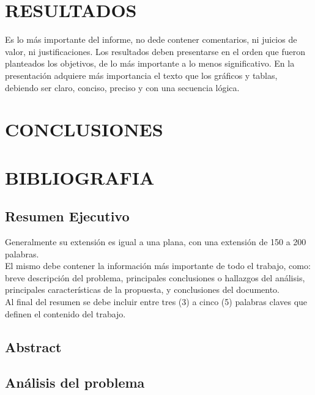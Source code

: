 \documentclass[12pt,letterpaper]{report}
\begin{document}
{\begin{multicols}{2}
	\section*{RESULTADOS}
	Es lo más importante del informe, no dede
contener comentarios, ni juicios de valor, ni
justificaciones.
Los resultados deben presentarse en el orden que fueron planteados los objetivos, de
lo más importante a lo menos significativo.
En la presentación adquiere más importancia el texto que los gráficos y tablas, debiendo ser claro, conciso, preciso y con una
secuencia lógica.
	\section*{CONCLUSIONES}
	\section*{BIBLIOGRAFIA}
	\end{multicols}
	\thispagestyle{empty}
	}
	
	\newpage
	\begin{center}
	\section*{Resumen Ejecutivo}
	\end{center}
	Generalmente su extensión es igual a una plana, con una extensión de 150 a 200 palabras.\\
El mismo debe contener la información más importante de todo el trabajo, como:
breve descripción del problema, principales conclusiones o hallazgos del análisis,
principales características de la propuesta, y conclusiones del documento.\\
Al final del resumen se debe incluir entre tres (3) a cinco (5) palabras claves que
definen el contenido del trabajo.
	\thispagestyle{empty}
	\newpage
	\begin{center}
	\section*{Abstract}
	\end{center}
	
	\thispagestyle{empty}
	\newpage
	
	\configurarIndices
    \tableofcontents
    \thispagestyle{empty}
    \newpage
    \listoffigures
    \thispagestyle{empty}
    \newpage
    \listoftables
    \thispagestyle{empty}
    \newpage
	
	
	\iniciarNumeracion
	\renewcommand{\thesection}{\arabic{section}}
	\begin{center}
	\section{Análisis del problema}
	\end{center}
	
\end{document}
